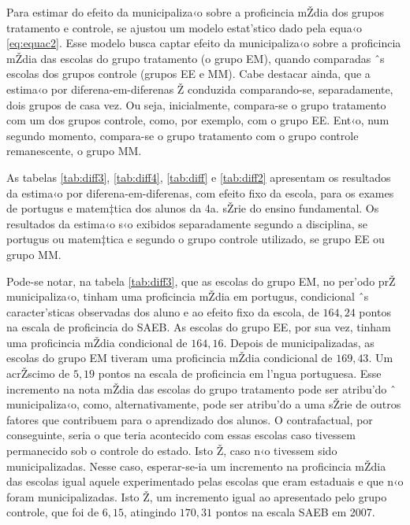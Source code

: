 \documentclass[a4paper, 12pt]{article}
\begin{document}
Para estimar do efeito da municipaliza‹o sobre a proficincia mŽdia dos grupos tratamento e controle, se ajustou um modelo estat’stico dado pela equa‹o \ref{eq:equac2}. Esse modelo busca captar efeito da municipaliza‹o sobre a proficincia mŽdia das escolas do grupo tratamento (o grupo EM), quando comparadas ˆs escolas dos grupos controle (grupos EE e MM). Cabe destacar ainda, que a estima‹o por diferena-em-diferenas Ž conduzida comparando-se, separadamente, dois grupos de casa vez. Ou seja, inicialmente, compara-se o grupo tratamento com um dos grupos controle, como, por exemplo, com o grupo EE. Ent‹o, num segundo momento, compara-se o grupo tratamento com o grupo controle remanescente, o grupo MM. 

As tabelas \ref{tab:diff3}, \ref{tab:diff4}, \ref{tab:diff} e \ref{tab:diff2} apresentam os resultados da estima‹o por diferena-em-diferenas, com efeito fixo da escola, para os exames de portugus e matem‡tica dos alunos da 4a. sŽrie do ensino fundamental. Os resultados da estima‹o s‹o exibidos separadamente segundo a disciplina, se portugus ou matem‡tica e segundo o grupo controle utilizado, se grupo EE ou grupo MM. 




                             


Pode-se notar, na tabela  \ref{tab:diff3}, que as escolas do grupo EM, no per’odo prŽ municipaliza‹o, tinham uma proficincia mŽdia em portugus, condicional ˆs caracter’sticas observadas dos aluno e ao efeito fixo da escola, de $164,24$ pontos na escala de proficincia do SAEB. As escolas do grupo EE, por sua vez, tinham uma proficincia mŽdia condicional de $164,16$. Depois de municipalizadas, as escolas do grupo EM tiveram uma proficincia mŽdia condicional de $169,43$. Um acrŽscimo de $5,19$ pontos na escala de proficincia em l’ngua portuguesa. Esse incremento na nota mŽdia das escolas do grupo tratamento pode ser atribu’do ˆ municipaliza‹o, como, alternativamente, pode ser atribu’do a uma sŽrie de outros fatores que contribuem para o aprendizado dos alunos. O contrafactual, por conseguinte, seria o que teria acontecido com essas escolas caso tivessem permanecido sob o controle do estado. Isto Ž, caso n‹o tivessem sido municipalizadas. Nesse caso, esperar-se-ia um incremento na proficincia mŽdia das escolas igual aquele experimentado pelas escolas que eram estaduais e que n‹o foram municipalizadas. Isto Ž, um incremento igual ao apresentado pelo grupo controle, que foi de $6,15$,  atingindo $170,31$ pontos na escala SAEB em 2007.
\end{document}
